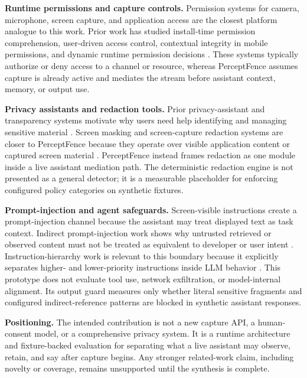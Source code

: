 \documentclass[manuscript,review,anonymous]{acmart}
\begin{document}
\textbf{Runtime permissions and capture controls.}
Permission systems for camera, microphone, screen capture, and application access are the closest platform analogue to this work.
Prior work has studied install-time permission comprehension, user-driven access control, contextual integrity in mobile permissions, and dynamic runtime permission decisions \citep{Felt2012AndroidPermissions,Roesner2012UserDrivenAccessControl,Wijesekera2015AndroidPermissionsRemystified,Wijesekera2017DynamicallyGrantedPermissions}.
These systems typically authorize or deny access to a channel or resource, whereas PerceptFence assumes capture is already active and mediates the stream before assistant context, memory, or output use.

\textbf{Privacy assistants and redaction tools.}
Prior privacy-assistant and transparency systems motivate why users need help identifying and managing sensitive material \citep{Liu2016PersonalizedPrivacyAssistant,Li2017PrivacyStreams}.
Screen masking and screen-capture redaction systems are closer to PerceptFence because they operate over visible application content or captured screen material \citep{Porat2009DynamicMasking,Goldsteen2015ApplicationScreenMasking,Cooley2012PrivacyPreservingScreenCapture}.
PerceptFence instead frames redaction as one module inside a live assistant mediation path.
The deterministic redaction engine is not presented as a general detector; it is a measurable placeholder for enforcing configured policy categories on synthetic fixtures.

\textbf{Prompt-injection and agent safeguards.}
Screen-visible instructions create a prompt-injection channel because the assistant may treat displayed text as task context.
Indirect prompt-injection work shows why untrusted retrieved or observed content must not be treated as equivalent to developer or user intent \citep{Greshake2023IndirectPromptInjection}.
Instruction-hierarchy work is relevant to this boundary because it explicitly separates higher- and lower-priority instructions inside LLM behavior \citep{Wallace2024InstructionHierarchy}.
This prototype does not evaluate tool use, network exfiltration, or model-internal alignment.
Its output guard measures only whether literal sensitive fragments and configured indirect-reference patterns are blocked in synthetic assistant responses.

\textbf{Positioning.}
The intended contribution is not a new capture API, a human-consent model, or a comprehensive privacy system.
It is a runtime architecture and fixture-backed evaluation for separating what a live assistant may observe, retain, and say after capture begins.
Any stronger related-work claim, including novelty or coverage, remains unsupported until the synthesis is complete.
\end{document}
